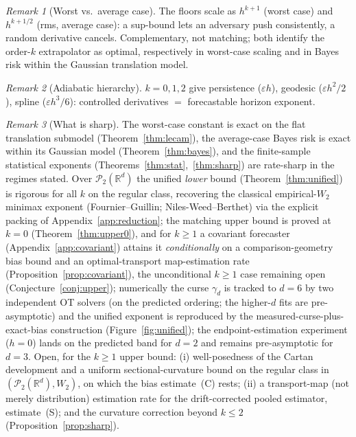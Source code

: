 \documentclass[11pt]{article}
\theoremstyle{definition}
\theoremstyle{remark}
\newtheorem{remark}{Remark}
\newcommand{\R}{\mathbb{R}}
\newcommand{\PP}{\mathcal{P}_2(\R^d)}
\begin{document}
\begin{remark}[Worst vs.\ average case]
The floors scale as $h^{k+1}$ (worst case) and $h^{k+1/2}$ (rms, average case): a sup-bound
lets an adversary push consistently, a random derivative cancels. Complementary, not
matching; both identify the order-$k$ extrapolator as optimal, respectively in worst-case scaling and in Bayes risk within the Gaussian translation model.
\end{remark}

\begin{remark}[Adiabatic hierarchy]
$k=0,1,2$ give persistence ($\varepsilon h$), geodesic ($\varepsilon h^2/2$), spline
($\varepsilon h^3/6$): controlled derivatives $=$ forecastable horizon exponent.
\end{remark}

\begin{remark}[What is sharp]
The worst-case constant is exact on the flat translation submodel (Theorem~\ref{thm:lecam}), the
average-case Bayes risk is exact within its Gaussian model (Theorem~\ref{thm:bayes}), and the
finite-sample statistical exponents (Theorems~\ref{thm:stat},~\ref{thm:sharp}) are rate-sharp in
the regimes stated. Over $\PP$ the unified \emph{lower} bound
(Theorem~\ref{thm:unified}) is rigorous for all $k$ on the regular class, recovering the classical
empirical-$W_2$ minimax exponent (Fournier--Guillin; Niles-Weed--Berthet) via the explicit packing of
Appendix~\ref{app:reduction}; the matching upper
bound is proved at $k=0$ (Theorem~\ref{thm:upper0}), and for $k\ge1$ a covariant forecaster
(Appendix~\ref{app:covariant}) attains it \emph{conditionally} on a comparison-geometry bias bound
and an optimal-transport map-estimation rate (Proposition~\ref{prop:covariant}), the unconditional
$k\ge1$ case remaining open (Conjecture~\ref{conj:upper}); numerically the curse $\gamma_d$ is
tracked to $d=6$ by two
independent OT solvers (on the predicted ordering; the higher-$d$ fits are pre-asymptotic) and the
unified exponent is reproduced by the measured-curse-plus-exact-bias
construction (Figure~\ref{fig:unified}); the endpoint-estimation experiment ($h=0$) lands on the
predicted band for $d=2$ and remains pre-asymptotic for $d=3$. Open, for the $k\ge1$ upper bound:
(i) well-posedness of the Cartan development and a uniform sectional-curvature bound on the regular
class in $(\PP,W_2)$, on which the bias estimate~(C) rests; (ii) a transport-map (not merely
distribution) estimation rate for the drift-corrected pooled estimator, estimate~(S); and the
curvature correction beyond $k\le2$ (Proposition~\ref{prop:sharp}).
\end{remark}
\end{document}
